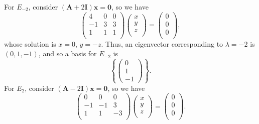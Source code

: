 \documentclass{article}
\begin{document}
\newline For $E_{-2}$, consider $(\mathbf{A}+2\mathbf{I})\mathbf{x}=\mathbf{0}$, so we have \[\left( \begin{matrix}
   4 & 0 & 0  \\
   -1 & 3 & 3  \\
   1 & 1 & 1  \\
\end{matrix} \right)\left( \begin{matrix}
   x  \\
   y  \\
   z  \\
\end{matrix} \right)=\left( \begin{matrix}
   0  \\
   0  \\
   0  \\
\end{matrix} \right),\] whose solution is $x=0$, $y=-z$. Thus, an eigenvector corresponding to $\lambda=-2$ is $(0,1,-1)$, and so a basis for $E_{-2}$ is \[\left\{\begin{pmatrix}0\\1\\-1\end{pmatrix}\right\}.\] For $E_2$, consider $(\mathbf{A}-2\mathbf{I})\mathbf{x}=\mathbf{0}$, so we have \[\left( \begin{matrix}
   0 & 0 & 0  \\
   -1 & -1 & 3  \\
   1 & 1 & -3  \\
\end{matrix} \right)\left( \begin{matrix}
   x  \\
   y  \\
   z  \\
\end{matrix} \right)=\left( \begin{matrix}
   0  \\
   0  \\
   0  \\
\end{matrix} \right).\]
\end{document}
